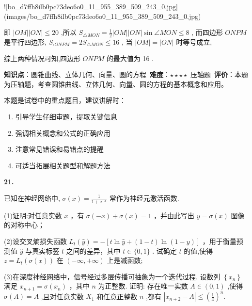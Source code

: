 \documentclass[10pt]{article}
\newenvironment{questionblock}[1]{%
  \needspace{3\baselineskip}%
  \noindent\textbf{#1.}%
}{%
  \par\vspace{1em}%
}
\begin{document}
![bo_d7ffh8ilb0pc73deo6o0_11_955_389_509_243_0.jpg](images/bo_d7ffh8ilb0pc73deo6o0_11_955_389_509_243_0.jpg)

即 \(\left| {OM}\right| \left| {ON}\right|  \leq  {20}\) ,所以 \({S}_{\bigtriangleup {MON}} = \frac{1}{2}\left| {OM}\right| \left| {ON}\right| \sin \angle {MON} \leq  8\) , 而四边形 \({ONPM}\) 是平行四边形, \({S}_{\square {ONPM}} = 2{S}_{\bigtriangleup {MON}} \leq  {16}\) , 当 \(\left| {OM}\right|  = \left| {ON}\right|\) 时等号成立,

综上两种情况可知,四边形 \({ONPM}\) 的最大值为 16 .

\begin{analysisbox}[考点分析]
\textbf{知识点}：圆锥曲线、立体几何、向量、圆的方程\
\textbf{难度}：$\star\star\star\star$ 压轴题\
\textbf{评价}：本题为压轴题，考查圆锥曲线、立体几何、向量、圆的方程的基本概念和应用。
\end{analysisbox}

\begin{tipbox}[教学提示]
本题是试卷中的重点题目，建议讲解时：
\begin{enumerate}
\item 引导学生仔细审题，提取关键信息
\item 强调相关概念和公式的正确应用
\item 注意常见错误和易错点的提醒
\item 可适当拓展相关题型和解题方法
\end{enumerate}
\end{tipbox}

\newpage

\begin{questionblock}{21}
已知在神经网络中, \(\sigma \left( x\right)  = \frac{1}{1 + {\mathrm{e}}^{-x}}\) 常作为神经元激活函数.

(1)证明:对任意实数 \(x\) ，有 \(\sigma \left( {-x}\right)  + \sigma \left( x\right)  = 1\) ，并由此写出 \(y = \sigma \left( x\right)\) 图像的对称中心；

(2)设交叉熵损失函数 \({L}_{t}\left( \widehat{y}\right)  =  - \left\lbrack  {t\ln \widehat{y} + \left( {1 - t}\right) \ln \left( {1 - y}\right) }\right\rbrack\) ，用于衡量预测值 \(\widehat{y}\) 与真实标签 \(t\) 之间的差异，其中 \(t \in  \{ 0,1\}\) . 试确定 \(t\) 的值,使得 \(z = {L}_{t}\left( {\sigma \left( x\right) }\right)\) 在 \(\left( {-\infty , + \infty }\right)\) 上是减函数;

(3)在深度神经网络中，信号经过多层传播可抽象为一个迭代过程. 设数列 \(\left\{  {x}_{n}\right\}\) 满足 \({x}_{n + 1} = \sigma \left( {x}_{n}\right)\) ，其中 \(n\) 为正整数. 证明: 存在唯一实数 \(A \in  \left( {0,1}\right)\) ,使得 \(\sigma \left( A\right)  = A\) ,且对任意实数 \({X}_{1}\) 和任意正整数 \(n\) ,都有 \(\left| {{x}_{n + 2} - A}\right|  \leq  {\left( \frac{1}{4}\right) }^{n}.\)
\end{questionblock}
\end{document}
